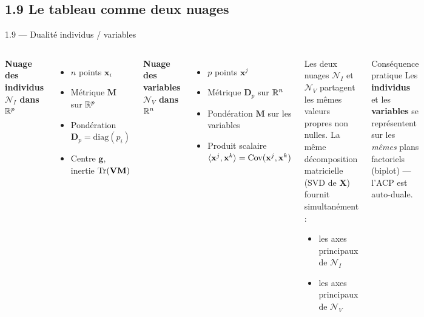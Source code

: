\subsection{1.9 Le tableau comme deux nuages}
\begin{frame}{1.9 — Dualité individus / variables}
\begin{columns}[T]
\textbf{Nuage des individus $\mathcal{N}_I$ dans $\mathbb{R}^p$}
\begin{itemize}\small
  \item $n$ points $\mathbf{x}_i$
  \item Métrique $\mathbf{M}$ sur $\mathbb{R}^p$
  \item Pondération $\mathbf{D}_p = \text{diag}(p_i)$
  \item Centre $\mathbf{g}$, inertie $\operatorname{Tr}(\mathbf{V}\mathbf{M})$
\end{itemize}

\vspace{0.2cm}
\textbf{Nuage des variables $\mathcal{N}_V$ dans $\mathbb{R}^n$}
\begin{itemize}\small
  \item $p$ points $\mathbf{x}^j$
  \item Métrique $\mathbf{D}_p$ sur $\mathbb{R}^n$
  \item Pondération $\mathbf{M}$ sur les variables
  \item Produit scalaire $\langle \mathbf{x}^j, \mathbf{x}^k \rangle = \operatorname{Cov}(\mathbf{x}^j, \mathbf{x}^k)$
\end{itemize}

\begin{theorem}[Dualité]
Les deux nuages $\mathcal{N}_I$ et $\mathcal{N}_V$ partagent les
\alert{mêmes valeurs propres non nulles}. La même décomposition
matricielle (SVD de $\mathbf{X}$) fournit simultanément :
\begin{itemize}\small
  \item les axes principaux de $\mathcal{N}_I$
  \item les axes principaux de $\mathcal{N}_V$
\end{itemize}
\end{theorem}

\begin{block}{Conséquence pratique}
\small Les \textbf{individus} et les \textbf{variables} se représentent
sur les \emph{mêmes} plans factoriels (biplot) — l'ACP est
\alert{auto-duale}.
\end{block}
\end{columns}
\end{frame}

